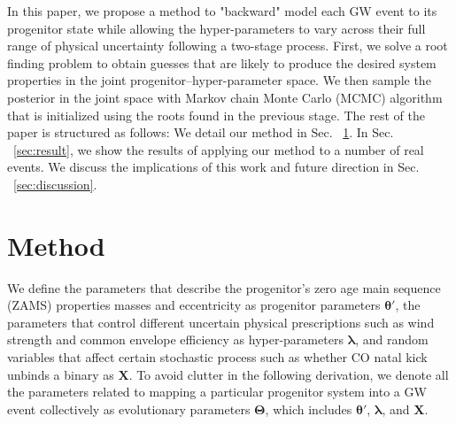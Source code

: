 \documentclass[twocolumn]{aastex631}
\begin{document}
In this paper, we propose a method to "backward" model each GW event to its progenitor state 
while allowing the hyper-parameters to vary across their full range of physical uncertainty
following a two-stage process.
First, we solve a root finding problem to obtain guesses that are likely to produce the desired system properties in the joint progenitor--hyper-parameter space.
We then sample the posterior in the joint space with Markov chain Monte Carlo (MCMC) algorithm that is initialized using the roots found in the previous stage.
The rest of the paper is structured as follows: We detail our method in Sec. ~\ref{sec:method}.
In Sec. ~\ref{sec:result}, we show the results of applying our method to a number of real events.
We discuss the implications of this work and future direction in Sec. ~\ref{sec:discussion}.

\section{Method}
\label{sec:method}



We define the parameters that describe the progenitor's zero age main sequence (ZAMS) properties
masses and eccentricity as progenitor parameters $\bm{\theta'}$, the parameters
that control different uncertain physical prescriptions such as wind strength and common
envelope efficiency as hyper-parameters $\bm{\lambda}$, and random variables
that affect certain stochastic process such as whether CO natal kick unbinds a
binary as $\bm{X}$. To avoid clutter in the following derivation, we denote all
the parameters related to mapping a particular progenitor system into a GW event
collectively as evolutionary parameters $\bm{\Theta}$, which includes
$\bm{\theta'}$, $\bm{\lambda}$, and $\bm{X}$.
\end{document}
